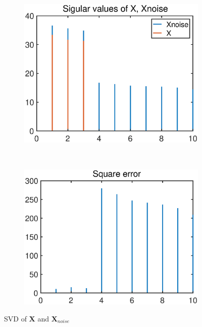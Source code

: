 \begin{figure}[htbp]
    \centering
     \begin{subfigure}{0.4\textwidth}
         \centering
         \includegraphics[width=\textwidth]{fig/16/16a1.eps}
     \end{subfigure}
     ~
     \begin{subfigure}{0.4\textwidth}
         \centering
         \includegraphics[width=\textwidth]{fig/16/16a2.eps}
     \end{subfigure}
    \caption{SVD of $\mathbf X$ and $\mathbf X_{noise}$}
    \label{fig:1_6_a}
\end{figure}
